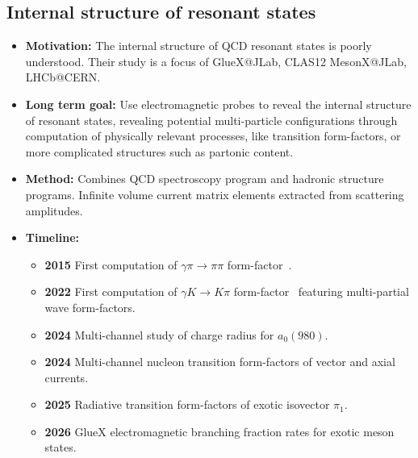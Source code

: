 \documentclass[12pt,hyperpdf]{article}
\begin{document}
\subsection{Internal structure of resonant states}
\begin{itemize}
    \item{\bf Motivation:} The internal structure of QCD resonant states
      is poorly understood. Their study is a focus of GlueX@JLab,
      CLAS12 MesonX@JLab, LHCb@CERN. 
    \item{\bf Long term goal:} Use electromagnetic probes to reveal the internal structure of resonant
      states, revealing potential multi-particle
      configurations through computation of physically relevant
      processes, like transition form-factors, or more complicated
      structures such as partonic content.
    \item{\bf Method:} Combines QCD spectroscopy program and hadronic
      structure programs. Infinite volume current matrix elements
      extracted from scattering amplitudes.
\item{\bf Timeline:}
\begin{itemize}
    \item{\bf 2015} First computation of $\gamma\pi\rightarrow\pi\pi$ form-factor~\cite{Briceno:2015dca}. 
    \item{\bf 2022} First computation of $\gamma K\rightarrow K\pi$
      form-factor~\cite{Radhakrishnan:2022ubg} featuring multi-partial
      wave form-factors.
    \item{\bf 2024} Multi-channel study of charge radius for $a_0(980)$.
    \item{\bf 2024} Multi-channel nucleon transition form-factors of
      vector and axial currents.
    \item{\bf 2025} Radiative transition form-factors of exotic isovector
      $\pi_1$.
    \item{\bf 2026} GlueX electromagnetic branching fraction rates for
      exotic meson states.
\end{itemize}
\end{itemize}

\end{document}
